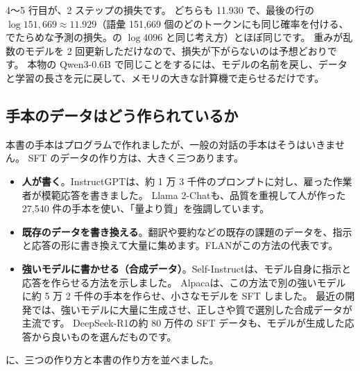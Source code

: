 4〜5 行目が、2 ステップの損失です。
どちらも 11.930 で、最後の行の $\log 151{,}669 \approx 11.929$（語彙 151,669 個のどのトークンにも同じ確率を付ける、でたらめな予測の損失。の $\log 4096$ と同じ考え方）とほぼ同じです。
重みが乱数のモデルを 2 回更新しただけなので、損失が下がらないのは予想どおりです。
本物の Qwen3-0.6B で同じことをするには、モデルの名前を戻し、データと学習の長さを元に戻して、メモリの大きな計算機で走らせるだけです。

\subsection{手本のデータはどう作られているか}\label{sec:post-data-sources}

本書の手本はプログラムで作れましたが、一般の対話の手本はそうはいきません。
SFT のデータの作り方は、大きく三つあります。

\begin{itemize}
\item \textbf{人が書く}。InstructGPT\cite{ouyang2022training}は、約 1 万 3 千件のプロンプトに対し、雇った作業者が模範応答を書きました。
Llama 2-Chat\cite{touvron2023llama2}も、品質を重視して人が作った 27,540 件の手本を使い、「量より質」を強調しています。
\item \textbf{既存のデータを書き換える}。翻訳や要約などの既存の課題のデータを、指示と応答の形に書き換えて大量に集めます。FLAN\cite{wei2022finetuned}がこの方法の代表です。
\item \textbf{強いモデルに書かせる（合成データ）}。Self-Instruct\cite{wang2023selfinstruct}は、モデル自身に指示と応答を作らせる方法を示しました。
Alpaca\cite{taori2023alpaca}は、この方法で別の強いモデルに約 5 万 2 千件の手本を作らせ、小さなモデルを SFT しました。
最近の開発では、強いモデルに大量に生成させ、正しさや質で選別した合成データが主流です。
DeepSeek-R1\cite{guo2025deepseekr1}の約 80 万件の SFT データも、モデルが生成した応答から良いものを選んだものです。
\end{itemize}

に、三つの作り方と本書の作り方を並べました。

